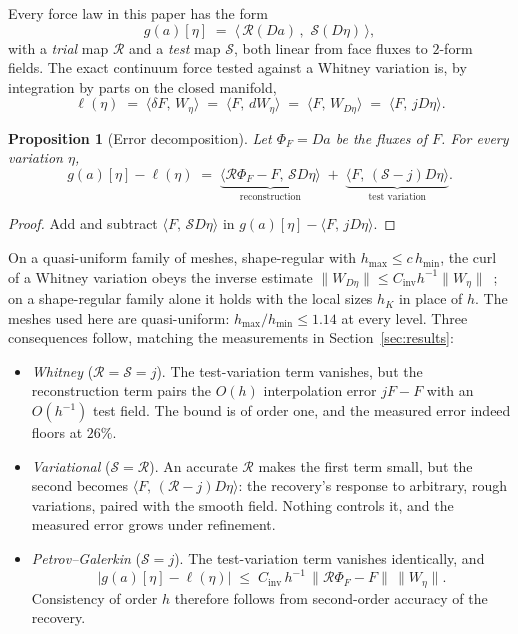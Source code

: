 \documentclass[11pt]{article}
\newtheorem{proposition}[theorem]{Proposition}
\theoremstyle{definition}
\theoremstyle{remark}
\newcommand{\cR}{\mathcal{R}}
\newcommand{\ip}[2]{\langle #1,\,#2\rangle}
\newcommand{\norm}[1]{\lVert #1\rVert}
\begin{document}
Every force law in this paper has the form
\begin{equation}\label{eq:form}
  g(a)[\eta] \;=\; \ip{\,\cR(Da)\,}{\,\mathcal{S}(D\eta)\,},
\end{equation}
with a \emph{trial} map $\cR$ and a \emph{test} map $\mathcal{S}$, both linear from face
fluxes to $2$-form fields. The exact continuum force tested against a Whitney variation
is, by integration by parts on the closed manifold,
\begin{equation}
  \ell(\eta) \;=\; \ip{\delta F}{W_\eta} \;=\; \ip{F}{dW_\eta} \;=\; \ip{F}{W_{D\eta}} \;=\; \ip{F}{j D\eta}.
\end{equation}

\begin{proposition}[Error decomposition]\label{prop:decomp}
Let $\Phi_F=Da$ be the fluxes of $F$. For every variation $\eta$,
\begin{equation}\label{eq:decomp}
  g(a)[\eta]-\ell(\eta) \;=\;
  \underbrace{\ip{\cR\Phi_F-F}{\mathcal{S}D\eta}}_{\text{reconstruction}}
  \;+\;
  \underbrace{\ip{F}{(\mathcal{S}-j)D\eta}}_{\text{test variation}}.
\end{equation}
\end{proposition}
\begin{proof}
Add and subtract $\ip{F}{\mathcal{S}D\eta}$ in $g(a)[\eta]-\ip{F}{jD\eta}$.
\end{proof}

On a quasi-uniform family of meshes, shape-regular with $h_{\max}\le c\,h_{\min}$, the curl of a
Whitney variation obeys the inverse estimate
$\norm{W_{D\eta}}\le C_{\mathrm{inv}}h^{-1}\norm{W_\eta}$~\cite{hiptmair2002}; on a shape-regular
family alone it holds with the local sizes $h_K$ in place of $h$. The meshes used here are
quasi-uniform: $h_{\max}/h_{\min}\le1.14$ at every level. Three
consequences follow, matching the measurements in Section~\ref{sec:results}:
\begin{itemize}
  \item \emph{Whitney} ($\cR=\mathcal{S}=j$). The test-variation term vanishes, but the
    reconstruction term pairs the $O(h)$ interpolation error $jF-F$ with an $O(h^{-1})$
    test field. The bound is of order one, and the measured error indeed floors at
    $26\%$.
  \item \emph{Variational} ($\mathcal{S}=\cR$). An accurate $\cR$ makes the first term
    small, but the second becomes $\ip{F}{(\cR-j)D\eta}$: the recovery's response to
    arbitrary, rough variations, paired with the smooth field. Nothing controls it, and
    the measured error grows under refinement.
  \item \emph{Petrov--Galerkin} ($\mathcal{S}=j$). The test-variation term vanishes
    identically, and
    \begin{equation}\label{eq:pgbound}
      |g(a)[\eta]-\ell(\eta)| \;\le\; C_{\mathrm{inv}}\,h^{-1}\,\norm{\cR\Phi_F-F}\,\norm{W_\eta}.
    \end{equation}
    Consistency of order $h$ therefore follows from second-order accuracy of the
    recovery.
\end{itemize}
\end{document}
